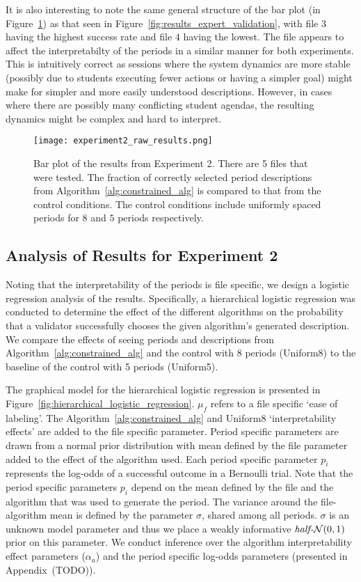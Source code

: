 It is also interesting to note the same general structure of the bar plot (in Figure~\ref{fig:experiment2_raw_results}) as that seen in Figure~\ref{fig:results_expert_validation}, with file $3$ having the highest success rate and file $4$ having the lowest. The file appears to affect the interpretabilty of the periods in a similar manner for both experiments. This is intuitively correct as sessions where the system dynamics are more stable (possibly due to students executing fewer actions or having a simpler goal) might make for simpler and more easily understood descriptions. However, in cases where there are possibly many conflicting student agendas, the resulting dynamics might be complex and hard to interpret.

\begin{figure}
\centering
\texttt{[image: experiment2\_raw\_results.png]}
\caption{Bar plot of the results from Experiment 2. There are 5 files that were tested. The fraction of correctly selected period descriptions from Algorithm~\ref{alg:constrained_alg} is compared to that from the control conditions. The control conditions include uniformly spaced periods for $8$ and $5$ periods respectively.}
\label{fig:experiment2_raw_results}
\end{figure}

\subsection{Analysis of Results for Experiment 2}
Noting that the interpretability of the periods is file specific, we design a logistic regression analysis of the results. Specifically, a hierarchical logistic regression was conducted to determine the effect of the different algorithms on the probability that a validator successfully chooses the given algorithm's generated description. We compare the effects of seeing periods and descriptions from Algorithm~\ref{alg:constrained_alg} and the control with $8$ periods (Uniform8) to the baseline of the control with 5 periods (Uniform5).

The graphical model for the hierarchical logistic regression is presented in Figure~\ref{fig:hierarchical_logistic_regression}. $\mu_f$ refers to a file specific `ease of labeling'. The Algorithm~\ref{alg:constrained_alg} and Uniform8 `interpretability effects' are added to the file specific parameter. Period specific parameters are drawn from a normal prior distribution with mean defined by the file parameter added to the effect of the algorithm used. Each period specific parameter $p_i$ represents the log-odds of a successful outcome in a Bernoulli trial. Note that the period specific parameters $p_i$ depend on the mean defined by the file and the algorithm that was used to generate the period. The variance around the file-algorithm mean is defined by the parameter $\sigma$, shared among all periods. $\sigma$ is an unknown model parameter and thus we place a weakly informative $\text{\textit{half-}}\mathcal{N}(0,1)$ prior on this parameter. We conduct inference over the algorithm interpretability effect parameters ($\alpha_a$) and the period specific log-odds parameters (presented in Appendix~(TODO)).

